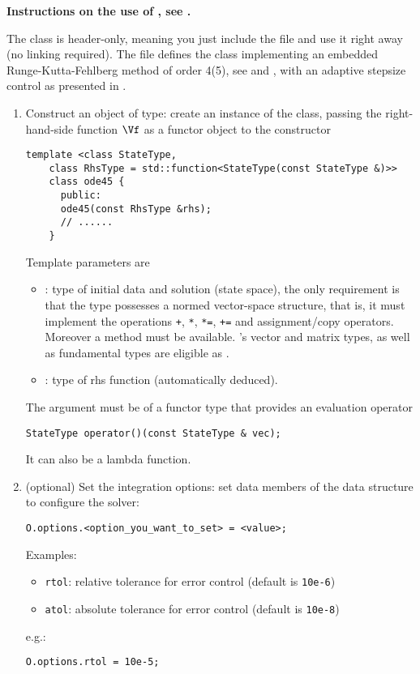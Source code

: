 \textbf{Instructions on the use of , see .}

The class  is header-only, meaning you just include the file and use it
right away (no linking required). The file  defines the class
 implementing an embedded Runge-Kutta-Fehlberg method of order 4(5), see
 and , with an adaptive stepsize control as presented in
. 

\begin{enumerate}
\item Construct an object of  type:
  create an instance of the class, passing the right-hand-side function $\Vf$ as a
  functor object to the constructor
  \begin{lstlisting}[style=cppsimple,emph={ode45},emph={[2]StateType,RhsType}]
    template <class StateType,
    class RhsType = std::function<StateType(const StateType &)>>
    class ode45 {
      public:
      ode45(const RhsType &rhs);
      // ......
    }
  \end{lstlisting}

  Template parameters are
  \begin{itemize}
  \item {}: type of initial data and solution (state space), the only requirement
    is that the type possesses a normed vector-space structure, that is, it must
    implement the operations \verb|+|, \verb|*|, \verb|*=|, \verb|+=| and
    assignment/copy operators. Moreover a  method must be available.
    \eigen's vector and matrix types, as well as fundamental types are eligible as
    .
  \item {}:    type of rhs function (automatically deduced).
  \end{itemize}
  The argument  must be of a functor type that provides an evaluation operator
  \begin{lstlisting}[style=cppsimple,emph={[2]StateType}]
    StateType operator()(const StateType & vec);
  \end{lstlisting}
  It can also be a lambda function. 
\item (optional) Set the integration options: set data members of the data structure
   to configure the solver:
  \begin{lstlisting}[style=cppsimple]
    O.options.<option_you_want_to_set> = <value>;
  \end{lstlisting}
  Examples:
  \begin{itemize}
  \item \texttt{rtol}:       relative tolerance for error control (default is \texttt{10e-6})
  \item \texttt{atol}:       absolute tolerance for error control (default is \texttt{10e-8})
  \end{itemize}
  e.g.:
  \begin{lstlisting}[style=cppsimple]
    O.options.rtol = 10e-5;
  \end{lstlisting}


\end{enumerate}
